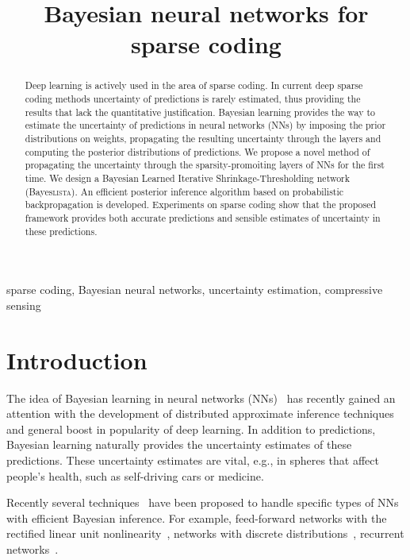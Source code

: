 \documentclass{article}
\title{Bayesian neural networks for sparse coding}
\begin{document}
\maketitle

\begin{abstract}
  Deep learning is actively used in the area of sparse coding. In current deep sparse coding methods uncertainty of predictions is rarely estimated, thus providing the results that lack the quantitative justification. Bayesian learning provides the way to estimate the uncertainty of predictions in neural networks (NNs) by imposing the prior distributions on weights, propagating the resulting uncertainty through the layers and computing the posterior distributions of predictions. We propose a novel method of propagating the uncertainty through the sparsity-promoiting layers of NNs for the first time. We design a Bayesian Learned Iterative Shrinkage-Thresholding network (Bayes\textsc{lista}). An efficient posterior inference algorithm based on probabilistic backpropagation is developed. Experiments on sparse coding show that the proposed framework provides both accurate predictions and sensible estimates of uncertainty in these predictions.
\end{abstract}

\begin{keywords}
sparse coding, Bayesian neural networks, uncertainty estimation, compressive sensing
\end{keywords}

\section{Introduction}
\label{sec:intro}

  The idea of Bayesian learning in neural networks (NNs)~\cite{neal2012bayesian} has recently gained an attention with the development of distributed approximate inference techniques~\cite{li2015stochastic, hoffman2013stochastic} and general boost in popularity of deep learning. In addition to predictions, Bayesian learning naturally provides the uncertainty estimates of these predictions. These uncertainty estimates are vital, e.g., in spheres that affect people's health, such as self-driving cars or medicine.

  Recently several techniques~\cite{ranganath2015deep, gal2016dropout} have been proposed to handle specific types of NNs with efficient Bayesian inference. For example, feed-forward networks with the rectified linear unit nonlinearity~\cite{hernandez2015probabilistic}, networks with discrete distributions~\cite{soudry2014expectation}, recurrent networks~\cite{mcdermott2017bayesian}.
\end{document}
